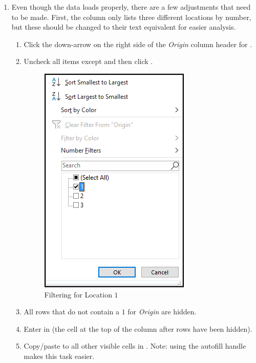 \begin{enumerate}[resume]

	\item Even though the data loads properly, there are a few adjustments that need to be made. First, the  column only lists three different locations by number, but these should be changed to their text equivalent for easier analysis.
	
	\begin{enumerate}
		\item Click the down-arrow on the right side of the \textit{Origin} column header for .
		\item Uncheck all items except  and then click .

		\begin{figure}[H]
			\centering
			\includegraphics[width=\maxwidth{.65\linewidth}]{gfx/ch09_fig70}
			\caption{Filtering for Location $ 1 $}
			\label{09:fig70}
		\end{figure}

		\item All rows that do not contain a $ 1 $ for \textit{Origin} are hidden. 
		\item Enter  in  (the cell at the top of the column after rows have been hidden).
		\item Copy/paste  to all other visible cells in .	Note: using the autofill handle makes this task easier.
		

\end{enumerate}
\end{enumerate}
